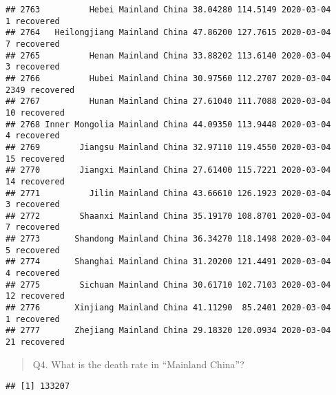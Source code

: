 \documentclass[
]{article}
\newenvironment{Shaded}{\begin{snugshade}}{\end{snugshade}}
\newcommand{\KeywordTok}[1]{\textcolor[rgb]{0.13,0.29,0.53}{\textbf{#1}}}
\newcommand{\NormalTok}[1]{#1}
\newcommand{\OperatorTok}[1]{\textcolor[rgb]{0.81,0.36,0.00}{\textbf{#1}}}
\newcommand{\StringTok}[1]{\textcolor[rgb]{0.31,0.60,0.02}{#1}}
\begin{document}
\begin{verbatim}
## 2763          Hebei Mainland China 38.04280 114.5149 2020-03-04     1 recovered
## 2764   Heilongjiang Mainland China 47.86200 127.7615 2020-03-04     7 recovered
## 2765          Henan Mainland China 33.88202 113.6140 2020-03-04     3 recovered
## 2766          Hubei Mainland China 30.97560 112.2707 2020-03-04  2349 recovered
## 2767          Hunan Mainland China 27.61040 111.7088 2020-03-04    10 recovered
## 2768 Inner Mongolia Mainland China 44.09350 113.9448 2020-03-04     4 recovered
## 2769        Jiangsu Mainland China 32.97110 119.4550 2020-03-04    15 recovered
## 2770        Jiangxi Mainland China 27.61400 115.7221 2020-03-04    14 recovered
## 2771          Jilin Mainland China 43.66610 126.1923 2020-03-04     3 recovered
## 2772        Shaanxi Mainland China 35.19170 108.8701 2020-03-04     7 recovered
## 2773       Shandong Mainland China 36.34270 118.1498 2020-03-04     5 recovered
## 2774       Shanghai Mainland China 31.20200 121.4491 2020-03-04     4 recovered
## 2775        Sichuan Mainland China 30.61710 102.7103 2020-03-04    12 recovered
## 2776       Xinjiang Mainland China 41.11290  85.2401 2020-03-04     1 recovered
## 2777       Zhejiang Mainland China 29.18320 120.0934 2020-03-04    21 recovered
\end{verbatim}

\begin{quote}
Q4. What is the death rate in ``Mainland China''?
\end{quote}

\begin{Shaded}
\end{Shaded}

\begin{verbatim}
## [1] 133207
\end{verbatim}

\begin{Shaded}
\end{Shaded}
\end{document}
